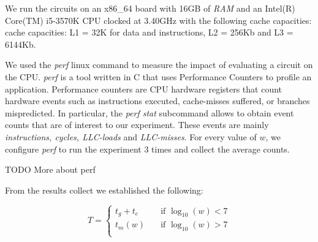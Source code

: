 \par
We run the circuits on an x86\_64 board with 16GB of \textit{RAM} and an Intel(R) Core(TM) i5-3570K CPU clocked at 3.40GHz with the following cache capacities: cache capacities: L1 = 32K for data and instructions, L2 = 256Kb and L3 = 6144Kb.
\par
We used the \textit{perf} linux command to measure the impact of evaluating a circuit on the CPU. \textit{perf} is a tool written in C that uses Performance Counters to profile an application. Performance counters are CPU hardware registers that count hardware events such as instructions executed, cache-misses suffered, or branches mispredicted\cite{perf}. In particular, the \textit{perf stat} subcommand allows to obtain event counts that are of interest to our experiment. These events are mainly \textit{instructions, cycles, LLC-loads} and \textit{LLC-misses}. For every value of $w$, we configure \textit{perf} to run the experiment 3 times and collect the average counts.


\par
TODO More about perf
\par
From the results collect we established the following:

\[ T =
  \begin{cases}
    t_g + t_e       & \quad \text{if } \log_{10}(w) < 7\\
    t_m(w) & \quad \text{if } \log_{10}(w) > 7\\
  \end{cases}
\]

